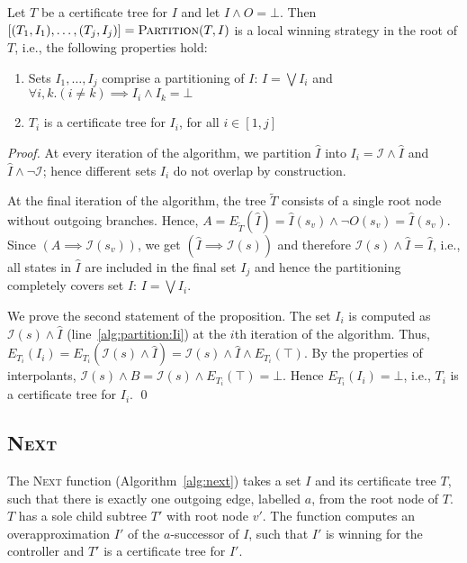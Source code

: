 \begin{proposition}\label{prop:partition}
    Let $T$ be a certificate tree for $I$ and let $I\land O =\bot$.  Then
    $[(T_1,I_1),\ldots,(T_j, I_j)] = \textsc{Partition}(T, I)$
    is a local winning strategy in the root of $T$, i.e., the
    following properties hold:
    \begin{enumerate}
        \item Sets $I_1,\ldots,I_j$ comprise a partitioning of
            $I$: $I=\bigvee I_i$ and $\forall i, k. (i\neq k)
            \implies I_i\land I_k=\bot$
        \item $T_i$ is a certificate tree for $I_i$, for all
            $i\in[1,j]$
    \end{enumerate}
\end{proposition}
\begin{proof}
    At every iteration of the algorithm, we partition $\hat{I}$
    into $I_i = \mathcal{I} \land\hat{I}$ and
    $\hat{I} \land \neg\mathcal{I}$; hence different sets $I_i$ do
    not overlap by construction.

    At the final iteration of the algorithm, the tree $\tilde{T}$
    consists of a single root node without outgoing branches.
    Hence, $A = E_{\tilde{T}}(\hat{I}) = \hat{I}(s_v) \land \neg O(s_v) =
    \hat{I}(s_v)$.  Since $(A\implies \mathcal{I}(s_v))$, we get $(\hat{I} \implies \mathcal{I}(s))$
    and therefore $\mathcal{I}(s) \land \hat{I} = \hat{I}$, i.e., all
    states in $\hat{I}$ are included in the final set $I_j$ and hence
    the partitioning completely covers set $I$: $I=\bigvee I_i$.

    We prove the second statement of the proposition.  The set $I_i$ is computed as
    $\mathcal{I}(s) \land \hat{I}$ (line~\ref{alg:partition:Ii}) at the $i$th iteration of the algorithm.
    Thus, $E_{T_i}(I_i) = E_{T_i}(\mathcal{I}(s) \land \hat{I}) = \mathcal{I}(s) \land \hat{I} \land E_{T_i}(\top)$.
    By the properties of interpolants, $\mathcal{I}(s) \land B = \mathcal{I}(s) \land E_{T_i}(\top) = \bot$.
    Hence $E_{T_i}(I_i) = \bot$, i.e., $T_i$ is a certificate tree for $I_i$.
    \qed
\end{proof}

\subsection{\textsc{Next}}

The \textsc{Next} function (Algorithm~\ref{alg:next}) takes a set $I$ and its certificate tree $T$, such
that there is exactly one outgoing edge, labelled $a$, from the root node of $T$.
$T$ has a sole child subtree $T'$ with root node $v'$.
The function computes an overapproximation $I'$ of the $a$-successor of $I$,
such that $I'$ is winning for the controller and $T'$ is a certificate tree for $I'$.

